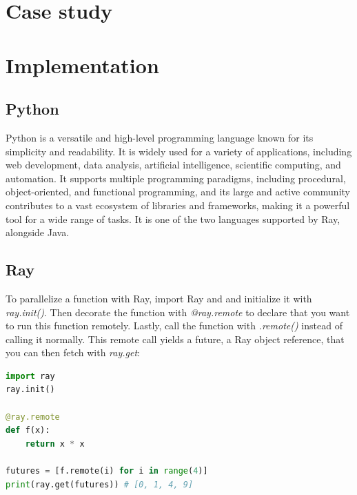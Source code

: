 \pagebreak
\section{Case study}

\section{Implementation}
\subsection{Python}
Python is a versatile and high-level programming language known for its simplicity and readability. It is widely used for a variety of applications, including web development, data analysis, artificial intelligence, scientific computing, and automation. It supports multiple programming paradigms, including procedural, object-oriented, and functional programming, and its large and active community contributes to a vast ecosystem of libraries and frameworks, making it a powerful tool for a wide range of tasks. It is one of the two languages supported by Ray, alongside Java.

\subsection{Ray}
To parallelize a function with Ray, import Ray and and initialize it with \textit{ray.init()}. Then decorate the function with \textit{@ray.remote} to declare that you want to run this function remotely. Lastly, call the function with \textit{.remote()} instead of calling it normally. This remote call yields a future, a Ray object reference, that you can then fetch with \textit{ray.get}:

\begin{lstlisting}[language=Python]
import ray
ray.init()

@ray.remote
def f(x):
    return x * x

futures = [f.remote(i) for i in range(4)]
print(ray.get(futures)) # [0, 1, 4, 9]
    \end{lstlisting}

